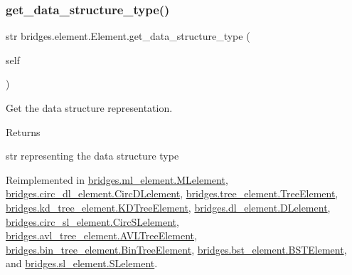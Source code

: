 \subsubsection{\texorpdfstring{get\_data\_structure\_type()}{get\_data\_structure\_type()}}
{\footnotesize\ttfamily  str bridges.\+element.\+Element.\+get\+\_\+data\+\_\+structure\+\_\+type (\begin{DoxyParamCaption}\item[{}]{self }\end{DoxyParamCaption})}



Get the data structure representation. 

\begin{DoxyReturn}{Returns}


str representing the data structure type 
\end{DoxyReturn}


Reimplemented in \mbox{\hyperlink{classbridges_1_1ml__element_1_1_m_lelement_a756749f461e226ce7ae7e46f6efa48f8}{bridges.\+ml\+\_\+element.\+M\+Lelement}}, \mbox{\hyperlink{classbridges_1_1circ__dl__element_1_1_circ_d_lelement_a86837fc443104b20589874000821afbd}{bridges.\+circ\+\_\+dl\+\_\+element.\+Circ\+D\+Lelement}}, \mbox{\hyperlink{classbridges_1_1tree__element_1_1_tree_element_a54a14bd74fe1f86dd73f90c57f88c10b}{bridges.\+tree\+\_\+element.\+Tree\+Element}}, \mbox{\hyperlink{classbridges_1_1kd__tree__element_1_1_k_d_tree_element_a4b38af960542ccc8c3b74d90ee9570e2}{bridges.\+kd\+\_\+tree\+\_\+element.\+K\+D\+Tree\+Element}}, \mbox{\hyperlink{classbridges_1_1dl__element_1_1_d_lelement_a6ffddb5ac79a3945c1559dbc2236ab81}{bridges.\+dl\+\_\+element.\+D\+Lelement}}, \mbox{\hyperlink{classbridges_1_1circ__sl__element_1_1_circ_s_lelement_a417f0fa7de0f4d1017ca7a27870c45d3}{bridges.\+circ\+\_\+sl\+\_\+element.\+Circ\+S\+Lelement}}, \mbox{\hyperlink{classbridges_1_1avl__tree__element_1_1_a_v_l_tree_element_a811dd4cebd36fda6531f6cbeb873c0e5}{bridges.\+avl\+\_\+tree\+\_\+element.\+A\+V\+L\+Tree\+Element}}, \mbox{\hyperlink{classbridges_1_1bin__tree__element_1_1_bin_tree_element_a9238744e18486fb8882238394f5efe7c}{bridges.\+bin\+\_\+tree\+\_\+element.\+Bin\+Tree\+Element}}, \mbox{\hyperlink{classbridges_1_1bst__element_1_1_b_s_t_element_a8e655e06ba0f77b7e2681b6d291f39de}{bridges.\+bst\+\_\+element.\+B\+S\+T\+Element}}, and \mbox{\hyperlink{classbridges_1_1sl__element_1_1_s_lelement_ae6d1c0479d0ed763e1ea54f5d2f9a0eb}{bridges.\+sl\+\_\+element.\+S\+Lelement}}.

\mbox{\label{classbridges_1_1element_1_1_element_a511fbc6323616d806ae0ae33010f4654}} 
